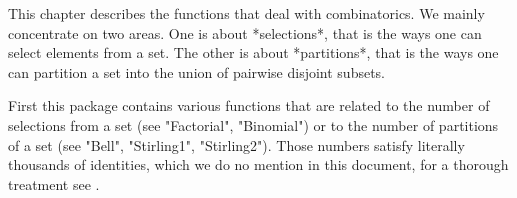 %

This chapter  describes the functions that   deal with combinatorics.  We
mainly concentrate on two areas.  One  is about *selections*, that is the
ways one   can  select   elements from  a   set.    The  other  is  about
*partitions*, that is the ways one can partition a set  into the union of
pairwise disjoint subsets.

First  this package contains  various  functions that are related  to the
number of  selections from a set  (see "Factorial", "Binomial") or to the
number  of  partitions of a  set  (see "Bell", "Stirling1", "Stirling2").
Those numbers satisfy literally thousands of identities,  which  we do no
mention in this document, for a thorough treatment see \cite{GKP90}.

